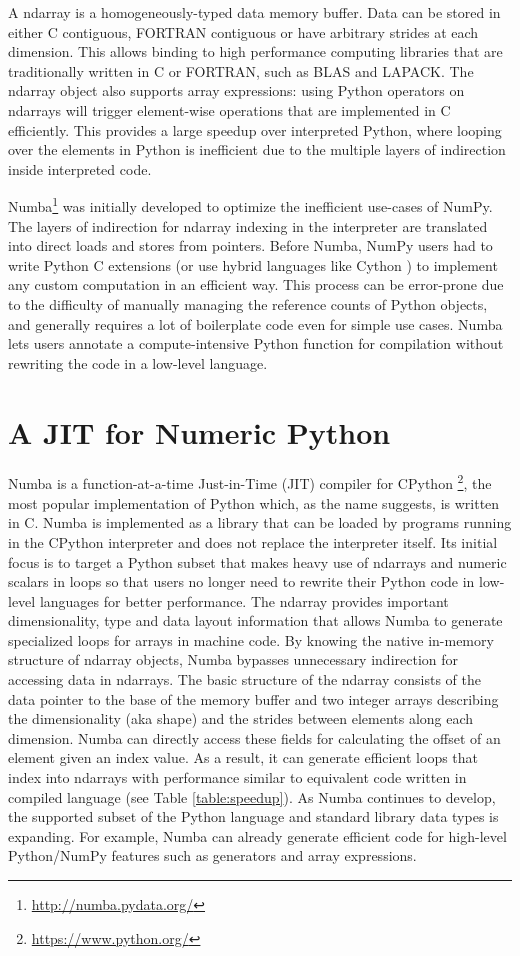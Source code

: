\documentclass{acm_proc_article-sp}
\begin{document}
A ndarray is a homogeneously-typed data memory buffer.  Data can be
stored in either C contiguous, FORTRAN contiguous or have arbitrary
strides at each dimension.  This allows binding to high performance
computing libraries that are traditionally written in C or FORTRAN,
such as BLAS and LAPACK. The ndarray object also supports array
expressions: using Python operators on ndarrays will trigger
element-wise operations that are implemented in C efficiently.  This
provides a large speedup over interpreted Python, where looping over
the elements in Python is inefficient due to the multiple layers of
indirection inside interpreted code.

Numba\footnote{\url{http://numba.pydata.org/}} was initially
developed to optimize the inefficient use-cases of NumPy.  The layers
of indirection for ndarray indexing in the interpreter are translated
into direct loads and stores from pointers.  Before Numba, NumPy users
had to write Python C extensions (or use hybrid languages like Cython
\cite{behnel:cython}) to implement any custom computation in an
efficient way.  This process can be error-prone due to the difficulty
of manually managing the reference counts of Python objects, and
generally requires a lot of boilerplate code even for simple use
cases.  Numba lets users annotate a compute-intensive Python function
for compilation without rewriting the code in a low-level language.

\section{A JIT for Numeric Python}

Numba is a function-at-a-time Just-in-Time (JIT) compiler for CPython
\footnote{\url{https://www.python.org/}}, the most popular
implementation of Python which, as the name suggests, is written in C.
Numba is implemented as a library that can be loaded by programs
running in the CPython interpreter and does not replace the interpreter
itself.  Its initial focus is to target a Python subset that makes
heavy use of ndarrays and numeric scalars in loops so that users no
longer need to rewrite their Python code in low-level languages for
better performance.  The ndarray provides important dimensionality,
type and data layout information that allows Numba to generate
specialized loops for arrays in machine code.  By knowing the native
in-memory structure of ndarray objects, Numba bypasses unnecessary
indirection for accessing data in ndarrays.  The basic structure of
the ndarray consists of the data pointer to the base of the memory
buffer and two integer arrays describing the dimensionality (aka
shape) and the strides between elements along each dimension. Numba
can directly access these fields for calculating the offset of an
element given an index value.  As a result, it can generate efficient
loops that index into ndarrays with performance similar to equivalent
code written in compiled language (see Table \ref{table:speedup}). As
Numba continues to develop, the supported subset of the Python
language and standard library data types is expanding.  For example,
Numba can already generate efficient code for high-level Python/NumPy
features such as generators and array expressions.
\end{document}
